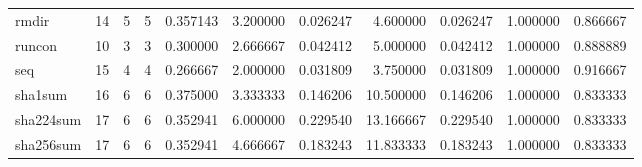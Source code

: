 \begin{tabular}{lrrrrrrrrrr}
rmdir     &                                      14 &                  5 &                                 5 &                                   0.357143 &                               3.200000 &                                     0.026247 &                          4.600000 &                                0.026247 &                           1.000000 &                                           0.866667 \\
runcon    &                                      10 &                  3 &                                 3 &                                   0.300000 &                               2.666667 &                                     0.042412 &                          5.000000 &                                0.042412 &                           1.000000 &                                           0.888889 \\
seq       &                                      15 &                  4 &                                 4 &                                   0.266667 &                               2.000000 &                                     0.031809 &                          3.750000 &                                0.031809 &                           1.000000 &                                           0.916667 \\
sha1sum   &                                      16 &                  6 &                                 6 &                                   0.375000 &                               3.333333 &                                     0.146206 &                         10.500000 &                                0.146206 &                           1.000000 &                                           0.833333 \\
sha224sum &                                      17 &                  6 &                                 6 &                                   0.352941 &                               6.000000 &                                     0.229540 &                         13.166667 &                                0.229540 &                           1.000000 &                                           0.833333 \\
sha256sum &                                      17 &                  6 &                                 6 &                                   0.352941 &                               4.666667 &                                     0.183243 &                         11.833333 &                                0.183243 &                           1.000000 &                                           0.833333 \\

\end{tabular}
